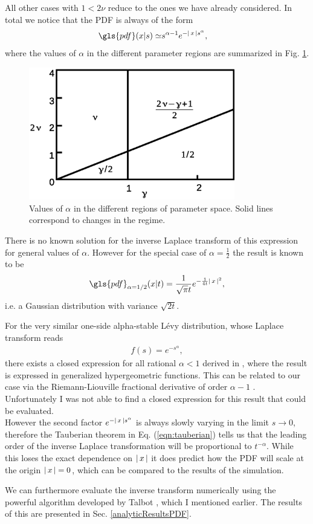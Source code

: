 All other cases with $1< 2\nu$ reduce to the ones we have already considered. In total we notice that the \gls{PDF} is always of the form 
%
\begin{align}
\gls{pdf}(x|s)\simeq & s^{\alpha-1} e^{-\abs{x} s^{\alpha}} ,
\end{align}
%
where the values of $\alpha$ in the different parameter regions are summarized in Fig. \ref{fig:alphaValuesPDF}.
%
\begin{figure}[h!]
\begin{center}
\includegraphics[width=90mm]{pics/alphaValuesPDF.eps}
\caption{Values of $\alpha$ in the different regions of parameter space. Solid lines correspond to changes in the regime.
\label{fig:alphaValuesPDF} }
\end{center}
\end{figure} 
%
There is no known solution for the inverse Laplace transform of this expression for general values of $\alpha$. However for the special case of $\alpha = \frac{1}{2} $ the result is known to be
%
\begin{align}
\gls{pdf}_{\alpha=1/2}(x|t) = \frac{1}{\sqrt{\pi}t}e^{-\frac{1}{4t}\abs{x}^2} ,
\end{align}
%
i.e. a Gaussian distribution with variance $\sqrt{2t}$. 

For the very similar one-side alpha-stable L\'evy distribution, whose Laplace transform reads
%
\begin{align}
f(s) = e^{-s^{\alpha}},
\end{align}
%
there exists a closed expression for all rational $\alpha<1$ derived in \cite{penson2010}, where the result is expressed in generalized hypergeometric functions. This can be related to our case via the Riemann-Liouville fractional derivative of order $\alpha-1$ \cite{mathai2009}. Unfortunately I was not able to find a closed expression for this result that could be evaluated.\\
However the second factor $e^{-\left|\,x\,\right|s^{\alpha}}$ is always slowly varying in the limit $s \to 0$, therefore the Tauberian theorem in Eq. (\ref{eqn:tauberian}) tells us that the leading order of the inverse Laplace transformation will be proportional to $t^{-\alpha}$. While this loses the exact dependence on $\left|\,x\,\right|$ it does predict how the \gls{PDF} will scale at the origin $\left|\,x\,\right|=0$, which can be compared to the results of the simulation.

We can furthermore evaluate the inverse transform numerically using the powerful algorithm developed by Talbot \cite{talbot1979}, which I mentioned earlier. The results of this are presented in Sec. \ref{analyticResultsPDF}.